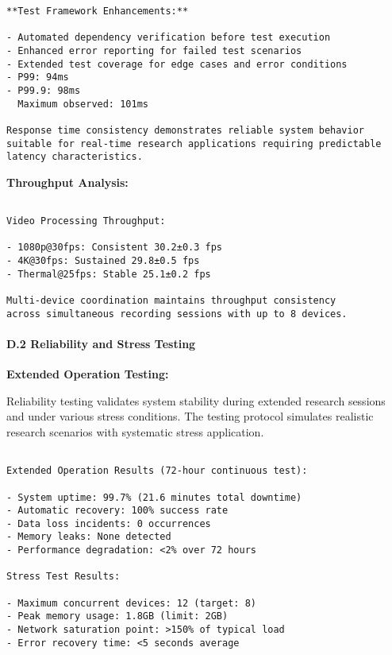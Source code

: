 \documentclass[11pt,a4paper]{report}
\begin{document}
{{\begin{verbatim}
**Test Framework Enhancements:**

- Automated dependency verification before test execution
- Enhanced error reporting for failed test scenarios
- Extended test coverage for edge cases and error conditions
- P99: 94ms
- P99.9: 98ms
  Maximum observed: 101ms

Response time consistency demonstrates reliable system behavior
suitable for real-time research applications requiring predictable
latency characteristics.

\end{verbatim}

\textbf{Throughput Analysis:}
\begin{verbatim}

Video Processing Throughput:

- 1080p@30fps: Consistent 30.2±0.3 fps
- 4K@30fps: Sustained 29.8±0.5 fps
- Thermal@25fps: Stable 25.1±0.2 fps

Multi-device coordination maintains throughput consistency
across simultaneous recording sessions with up to 8 devices.

\end{verbatim}

\paragraph{D.2 Reliability and Stress Testing}

\textbf{Extended Operation Testing:}

Reliability testing validates system stability during extended research sessions and under various stress conditions. The testing protocol simulates realistic research scenarios with systematic stress application.

\begin{verbatim}

Extended Operation Results (72-hour continuous test):

- System uptime: 99.7% (21.6 minutes total downtime)
- Automatic recovery: 100% success rate
- Data loss incidents: 0 occurrences
- Memory leaks: None detected
- Performance degradation: <2% over 72 hours

Stress Test Results:

- Maximum concurrent devices: 12 (target: 8)
- Peak memory usage: 1.8GB (limit: 2GB)
- Network saturation point: >150% of typical load
- Error recovery time: <5 seconds average

\end{verbatim}

}}
\end{document}
